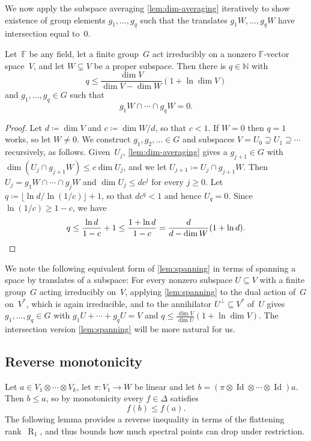 \documentclass[11pt,letterpaper]{article}
\DeclareMathOperator{\tensorrank}{R}
\newcommand{\FF}{\mathbb{F}}
\newcommand{\NN}{\mathbb{N}}
\DeclareMathOperator{\Id}{Id}
\begin{document}
We now apply the subspace averaging \cref{lem:dim-averaging} iteratively to show existence of group elements $g_1, \ldots, g_q$ such that the translates $g_1 W, \ldots, g_q W$ have intersection equal to~$0$.

\begin{lemma}\label{lem:spanning}
Let~$\FF$ be any field, let a finite group~$G$ act irreducibly on a nonzero $\FF$-vector space~$V$, and let $W \subsetneq V$ be a proper subspace. Then there is $q \in \NN$ with 
\[
q \leq \frac{\dim V}{\dim V - \dim W}(1 + \ln \dim V)
\]
and $g_1, \ldots, g_q \in G$ such that 
\[
g_1 W \cap \cdots \cap g_q W = 0.
\]
\end{lemma}
\begin{proof}
Let $d \coloneqq \dim V$ and $c \coloneqq \dim W / d$, so that $c < 1$. If $W = 0$ then $q = 1$ works, so let $W \neq 0$. We construct $g_1, g_2, \ldots \in G$ and subspaces $V = U_0 \supseteq U_1 \supseteq \cdots$ recursively, as follows. Given~$U_j$, \cref{lem:dim-averaging} gives a $g_{j+1} \in G$ with $\dim(U_j \cap g_{j+1} W) \leq c \dim U_j$, and we let $U_{j+1} \coloneqq U_j \cap g_{j+1} W$. Then $U_j = g_1 W \cap \cdots \cap g_j W$ and $\dim U_j \leq d c^j$ for every $j \geq 0$.
Let $q \coloneqq \lfloor \ln d / \ln(1/c) \rfloor + 1$, so that $d c^q < 1$ and hence $U_q = 0$. Since $\ln(1/c) \geq 1 - c$, we have
\[
q \leq \frac{\ln d}{1-c} + 1 \leq \frac{1 + \ln d}{1-c} = \frac{d}{d - \dim W}(1 + \ln d). \qedhere
\]
\end{proof}

We note the following equivalent form of \cref{lem:spanning} in terms of spanning a space by translates of a subspace: For every nonzero subspace $U \subseteq V$ with a finite group~$G$ acting irreducibly on~$V$, applying \cref{lem:spanning} to the dual action of~$G$ on~$V^*$, which is again irreducible, and to the annihilator $U^\perp \subseteq V^*$ of~$U$ gives $g_1, \ldots, g_q \in G$ with $g_1 U + \cdots + g_q U = V$ and $q \leq \frac{\dim V}{\dim U}(1 + \ln \dim V)$. The intersection version \cref{lem:spanning} will be more natural for us.

\subsection{Reverse monotonicity}

Let $a \in V_1 \otimes \cdots \otimes V_k$, let $\pi : V_1 \to W$ be linear and let $b = (\pi \otimes \Id \otimes \cdots \otimes \Id)a$. Then $b \leq a$, so by monotonicity every $f \in \Delta$ satisfies
\[
f(b) \leq f(a).
\]
The following lemma provides a reverse inequality in terms of the flattening rank~$\tensorrank_1$, and thus bounds how much spectral points can drop under restriction.
\end{document}
